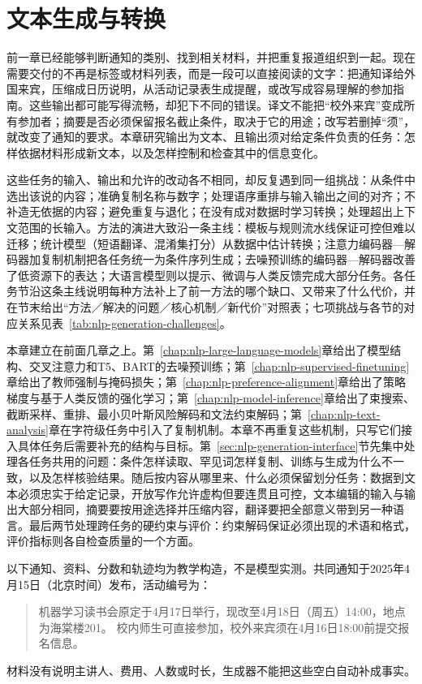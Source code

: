 \chapter{文本生成与转换}
\label{chap:nlp-text-generation}

前一章已经能够判断通知的类别、找到相关材料，并把重复报道组织到一起。现在需要交付的不再是标签或材料列表，而是一段可以直接阅读的文字：把通知译给外国来宾，压缩成日历说明，从活动记录表生成提醒，或改写成容易理解的参加指南。这些输出都可能写得流畅，却犯下不同的错误。译文不能把“校外来宾”变成所有参加者；摘要是否必须保留报名截止条件，取决于它的用途；改写若删掉“须”，就改变了通知的要求。本章研究输出为文本、且输出须对给定条件负责的任务：怎样依据材料形成新文本，以及怎样控制和检查其中的信息变化。

这些任务的输入、输出和允许的改动各不相同，却反复遇到同一组挑战：从条件中选出该说的内容；准确复制名称与数字；处理语序重排与输入输出之间的对齐；不补造无依据的内容；避免重复与退化；在没有成对数据时学习转换；处理超出上下文范围的长输入。方法的演进大致沿一条主线：模板与规则流水线保证可控但难以迁移；统计模型（短语翻译、混淆集打分）从数据中估计转换；注意力编码器—解码器加复制机制把各任务统一为条件序列生成；去噪预训练的编码器—解码器改善了低资源下的表达；大语言模型则以提示、微调与人类反馈完成大部分任务。各任务节沿这条主线说明每种方法补上了前一方法的哪个缺口、又带来了什么代价，并在节末给出“方法／解决的问题／核心机制／新代价”对照表；七项挑战与各节的对应关系见表~\ref{tab:nlp-generation-challenges}。

本章建立在前面几章之上。第~\ref{chap:nlp-large-language-models}章给出了模型结构、交叉注意力和T5、BART的去噪预训练；第~\ref{chap:nlp-supervised-finetuning}章给出了教师强制与掩码损失；第~\ref{chap:nlp-preference-alignment}章给出了策略梯度与基于人类反馈的强化学习；第~\ref{chap:nlp-model-inference}章给出了束搜索、截断采样、重排、最小贝叶斯风险解码和文法约束解码；第~\ref{chap:nlp-text-analysis}章在字符级任务中引入了复制机制。本章不再重复这些机制，只写它们接入具体任务后需要补充的结构与目标。第~\ref{sec:nlp-generation-interface}节先集中处理各任务共用的问题：条件怎样读取、罕见词怎样复制、训练与生成为什么不一致，以及怎样核验结果。随后按内容从哪里来、什么必须保留划分任务：数据到文本必须忠实于给定记录，开放写作允许虚构但要连贯且可控，文本编辑的输入与输出大部分相同，摘要要按用途选择并压缩内容，翻译要把全部意义带到另一种语言。最后两节处理跨任务的硬约束与评价：约束解码保证必须出现的术语和格式，评价指标则各自检查质量的一个方面。

以下通知、资料、分数和轨迹均为教学构造，不是模型实测。共同通知于2025年4月15日（北京时间）发布，活动编号为：
\begin{quote}
机器学习读书会原定于4月17日举行，现改至4月18日（周五）14:00，地点为海棠楼201。
校内师生可直接参加，校外来宾须在4月16日18:00前提交报名信息。
\end{quote}
材料没有说明主讲人、费用、人数或时长，生成器不能把这些空白自动补成事实。

